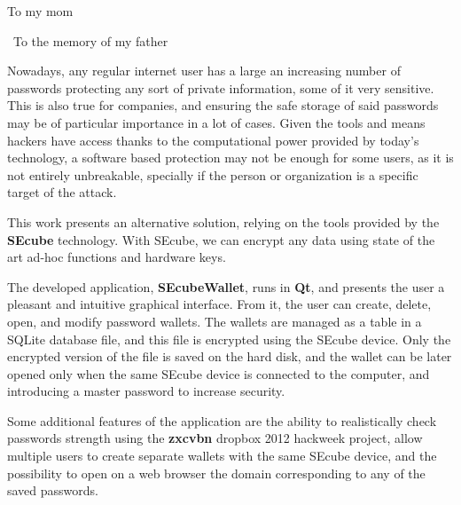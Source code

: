 \documentclass[%
    corpo=13pt,
    twoside,
    oldstyle,
    autoretitolo,
    greek,
    evenboxes,
]{toptesi}
\begin{document}
 \frontespizio %
 
    \begin{dedica}
        To my mom

        \textdagger\ To the memory of my father
    \end{dedica}
   

\listoftodos

\sommario

Nowadays, any regular internet user has a large an increasing number of passwords protecting any sort of private information, some of it very sensitive. This is also true for companies, and ensuring the safe storage of said passwords may be of particular importance in a lot of cases. 
Given the tools and means hackers have access thanks to the computational power provided by today's technology, a software based protection may not be enough for some users, as it is not entirely unbreakable, specially if the person or organization is a specific target of the attack.

This work presents an alternative solution, relying on the tools provided by the \textbf{SEcube} technology. With SEcube, we can encrypt any data using state of the art ad-hoc functions and hardware keys. 


The developed application, \textbf{SEcubeWallet}, runs in \textbf{Qt}, and presents the user a pleasant and intuitive graphical interface. From it, the user can create, delete, open, and modify password wallets. The wallets are managed as a table in a SQLite database file, and this file is encrypted using the SEcube device. Only the encrypted version of the file is saved on the hard disk, and the wallet can be later opened only when the same SEcube device is connected to the computer, and introducing a master password to increase security. 

Some additional features of the application are the ability to realistically check passwords strength using the \textbf{zxcvbn} dropbox 2012 hackweek project, allow multiple users to create separate wallets with the same SEcube device, and the possibility to open on a web browser the domain corresponding to any of the saved passwords.
\end{document}
